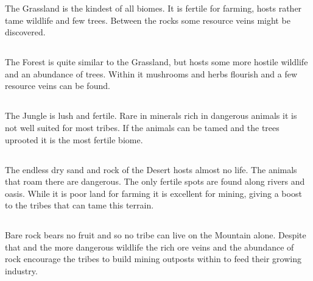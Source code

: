 The \Gls*{Grassland} is the kindest of all biomes. It is fertile for farming,
hosts rather tame wildlife and few trees. Between the rocks some resource veins
might be discovered.

\subsection{}\label{ch:World:Biomes:Forest}

The \gls*{Forest} is quite similar to the \gls{Grassland}, but hosts some more
hostile wildlife and an abundance of trees. Within it mushrooms and herbs
flourish and a few resource veins can be found.

\subsection{}\label{ch:World:Biomes:Jungle}

The \gls*{Jungle} is lush and fertile. Rare in minerals rich in dangerous
animals it is not well suited for most tribes. If the animals can be tamed and
the trees uprooted it is the most fertile biome.

\subsection{}\label{ch:World:Biomes:Desert}

The endless dry sand and rock of the \gls*{Desert} hosts almost no life. The
animals that roam there are dangerous. The only fertile spots are found along
rivers and oasis. While it is poor land for farming it is excellent for mining,
giving a boost to the tribes that can tame this terrain.

\subsection{}\label{ch:World:Biomes:Mountain}

Bare rock bears no fruit and so no tribe can live on the \gls*{Mountain} alone.
Despite that and the more dangerous wildlife the rich ore veins and the
abundance of rock encourage the tribes to build mining outposts within to feed
their growing industry.

\subsection{}\label{ch:World:Biomes:Sea}


